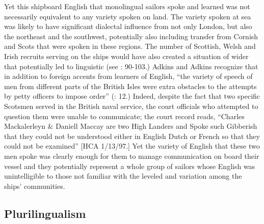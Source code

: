 Yet this shipboard English that monolingual sailors spoke and learned was not necessarily equivalent to any variety spoken on land. The variety spoken at sea was likely to have significant dialectal influence from not only London, but also the northeast and the southwest, potentially also including transfer from Cornish and Scots that were spoken in these regions. The number of Scottish, Welsh and Irish recruits serving on the ships would have also created a situation of wider  that potentially led to linguistic  (see \citealt{Trudgill1986}: 90-103.) Adkins and Adkins recognize that in addition to foreign accents from learners of English, “the variety of speech of men from different parts of the British Isles were extra obstacles to the attempts by petty officers to impose order” (\citealt{AdkinsAdkins2008}: 12.) Indeed, despite the fact that two specific Scotsmen served in the British naval service, the court officials who attempted to question them were unable to communicate; the court record reads, “Charles Mackalerleyn \& Daniell Maccay are two High Landers and Spoke such Gibberish that they could not be understood either in English Dutch or French so that they could not be examined” [HCA 1/13/97.] Yet the variety of English that these two men spoke was clearly enough for them to manage communication on board their vessel and they potentially represent a whole group of sailors whose English was unintelligible to those not familiar with the leveled  and variation among the ships’ communities. 

\subsection{{Plurilingualism}}\label{sec:3.10.2}


